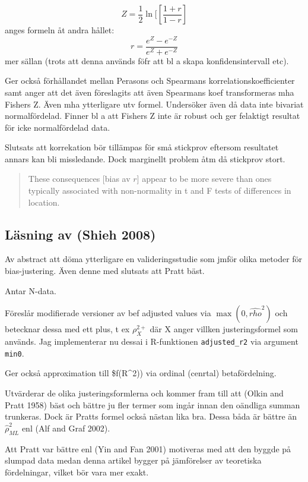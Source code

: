 \documentclass[]{article}
\begin{document}
\[Z = \frac{1}{2}\ln[\left[\frac{1+r}{1-r}\right]\] anges formeln åt
andra hållet: \[r = \frac{e^Z - e^{-Z}}{e^Z + e^{-Z}}\] mer sällan
(trots att denna används föfr att bl a skapa konfidensintervall etc).

Ger också förhållandet mellan Perasons och Spearmans
korrelationskoefficienter samt anger att det även föreslagits att även
Spearmans koef transformeras mha Fishers Z. Även mha ytterligare utv
formel. Undersöker även då data inte bivariat normalfördelad. Finner bl
a att Fishers Z inte är robust och ger felaktigt resultat för icke
normalfördelad data.

Slutsats att korrekation bör tillämpas för små stickprov eftersom
resultatet annars kan bli missledande. Dock marginellt problem åtm då
stickprov stort.

\begin{quote}
These consequences {[}bias av \(r\){]} appear to be more severe than
ones typically associated with non-normality in t and F tests of
differences in location.
\end{quote}

\subsection{Läsning av (Shieh 2008)}\label{lasning-av-shieh2008}

Av abstract att döma ytterligare en valideringsstudie som jmför olika
metoder för bias-justering. Även denne med slutsats att Pratt bäst.

Antar N-data.

Föreslår modifierade versioner av bef adjusted values via
\(\max(0, \hat{rho}^2)\) och betecknar dessa med ett plus, t ex
\(\rho^{2+}_X\) där X anger villken justeringsformel som används. Jag
implementerar nu dessai i R-funktionen \texttt{adjusted\_r2} via
argument \texttt{min0}.

Ger också approximation till \$f(R\^{}2)) via ordinal (cenrtal)
betafördelning.

Utvärderar de olika justeringsformlerna och kommer fram till att (Olkin
and Pratt 1958) bäst och bättre ju fler termer som ingår innan den
oändliga summan trunkeras. Dock är Pratts formel också nästan lika bra.
Dessa båda är bättre än \(\hat{\rho}_{ML}^2\) enl (Alf and Graf 2002).

Att Pratt var bättre enl (Yin and Fan 2001) motiveras med att den byggde
på slumpad data medan denna artikel bygger på jämförelser av teoretiska
fördelningar, vilket bör vara mer exakt.
\end{document}
